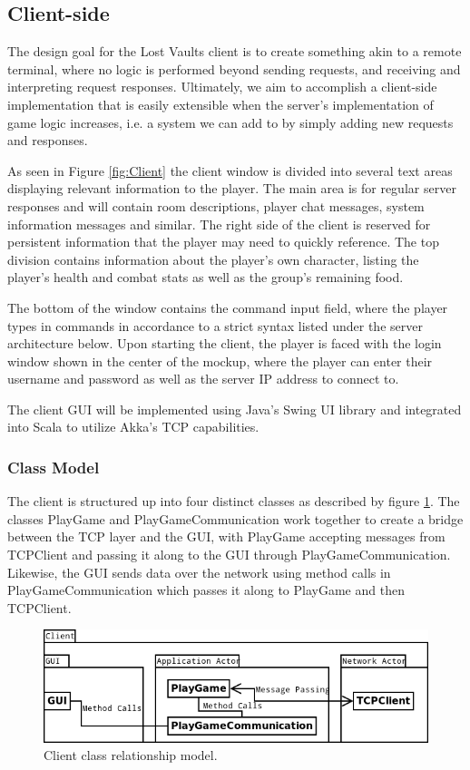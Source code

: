 \documentclass[a4paper]{article}
\begin{document}
\subsection{Client-side}
The design goal for the Lost Vaults client is to create something akin to a remote terminal, where no logic is performed beyond sending requests, and receiving and interpreting request responses. Ultimately, we aim to accomplish a client-side implementation that is easily extensible when the server's implementation of game logic increases, i.e. a system we can add to by simply adding new requests and responses.

As seen in Figure \ref{fig:Client} the client window is divided into several text areas displaying relevant information to the player. The main area is for regular server responses and will contain room descriptions, player chat messages, system information messages and similar.
The right side of the client is reserved for persistent information that the player may need to quickly reference. The top division contains information about the player's own character, listing the player's health and combat stats as well as the group's remaining food.

The bottom of the window contains the command input field, where the player types in commands in accordance to a strict syntax listed under the server architecture below.
Upon starting the client, the player is faced with the login window shown in the center of the mockup, where the player can enter their username and password as well as the server IP address to connect to.

The client GUI will be implemented using Java's Swing UI library and integrated into Scala to utilize Akka's TCP capabilities.
\subsubsection{Class Model}
The client is structured up into four distinct classes as described by figure \ref{fig:ClientArch}. The classes PlayGame and PlayGameCommunication work together to create a bridge between the TCP layer and the GUI, with PlayGame accepting messages from TCPClient and passing it along to the GUI through PlayGameCommunication. 
Likewise, the GUI sends data over the network  using method calls in PlayGameCommunication which passes it along to PlayGame and then TCPClient.
\begin{figure}[hbt]
\centering
\includegraphics[width=1.0\textwidth]{clientuml1}
\caption{\label{fig:ClientArch}Client class relationship model.}
\end{figure}
\end{document}
